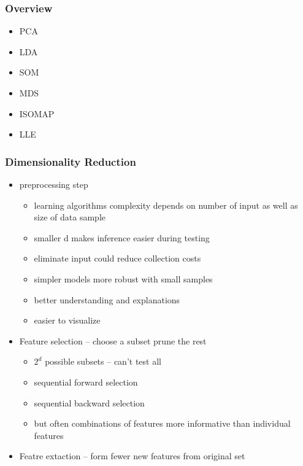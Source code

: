 \documentclass{beamer}
\begin{document}
\begin{frame}
  \frametitle{Overview}
  \begin{itemize}
  \item PCA
  \item LDA
  \item SOM
  \item MDS
  \item ISOMAP
  \item LLE
  \end{itemize}

\end{frame}


  \begin{frame}
    \frametitle{Dimensionality Reduction}
    \begin{itemize}
    \item preprocessing step
      \begin{itemize}
      \item learning algorithms complexity depends on number of input as well as size of data sample
      \item smaller d makes inference easier during testing
      \item eliminate input could reduce collection costs
      \item simpler models more robust with small samples
      \item better understanding and explanations
      \item easier to visualize
      \end{itemize}

    \item Feature selection -- choose a subset prune the rest
      \begin{itemize}
      \item $2^d$ possible subsets -- can't test all
      \item sequential forward selection
      \item sequential backward selection
      \item but often combinations of features more informative than individual features
      \end{itemize}

    \item Featre extaction -- form fewer new features from original set
    \end{itemize}
  \end{frame}
\end{document}

